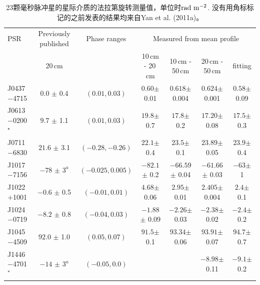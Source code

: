 \begin{landscape}
\begin{table}
\centering
\caption{23颗毫秒脉冲星的星际介质的法拉第旋转测量值，单位时$\rm{rad\ m^{-2}}$. 
没有用角标标记的之前发表的结果均来自Yan et al. (2011a)。}
\label{rm}
\begin{tabular}{lcccccc}
\hline
PSR          &    Previously published &  Phase ranges        &    \multicolumn{4}{c}{Measured from mean profile}                   \\  
             &    20\,cm               &                      &    10\,cm - 20\,cm  &  10\,cm - 50\,cm   &  20\,cm - 50\,cm   &    fitting      \\   
\hline
J0437$-$4715            & $0.0   $ $\pm$ 0.4      &  $(0.01, 0.03)   $ & $0.60   $$\pm$ 0.01  & $0.618   $$\pm$ 0.004 &  $0.624   $$\pm$ 0.001 &  $0.58   $$\pm$ 0.09   \\  
J0613$-$0200$^\star$    & $9.7   $ $\pm$ 1.1      &  $(0.01, 0.03)   $ & $19.8   $$\pm$ 0.7   & $17.8    $$\pm$ 0.2   &  $17.20   $$\pm$ 0.08  &  $17.5   $$\pm$ 0.3   \\  
J0711$-$6830            & $21.6  $ $\pm$ 3.1      &  $(-0.28, -0.26) $ & $22.1   $$\pm$ 0.4   & $23.5    $$\pm$ 0.1   &  $23.89   $$\pm$ 0.05  &  $23.9   $$\pm$ 0.4   \\  
J1017$-$7156            & $-78   $ $\pm$ $3^a$    &  $(-0.025, 0.005)$ & $-82.1  $$\pm$ 0.2   & $-66.59  $$\pm$ 0.04  &  $-61.66  $$\pm$ 0.03  &  $-63    $$\pm$ 1    \\
J1022$+$1001            & $-0.6  $ $\pm$ 0.5      &  $(-0.01, 0.01)  $ & $4.68   $$\pm$ 0.06  & $2.95    $$\pm$ 0.01  &  $2.405   $$\pm$ 0.004 &  $2.4    $$\pm$ 0.1   \\  
J1024$-$0719            & $-8.2  $ $\pm$ 0.8      &  $(-0.04, 0.03)  $ & $-1.88  $$\pm$ 0.09  & $-2.26   $$\pm$ 0.03  &  $-2.38   $$\pm$ 0.02  &  $-2.4   $$\pm$ 0.2    \\  
J1045$-$4509            & $92.0  $ $\pm$ 1.0      &  $(0.05, 0.07)   $ & $91.5   $$\pm$ 0.1   & $93.34   $$\pm$ 0.06  &  $93.91   $$\pm$ 0.07  &  $94.7   $$\pm$ 0.7    \\  
J1446$-$4701$^\ast$     & $-14   $ $\pm$ $3^a$    &  $(-0.05, 0.0)   $ &                      &                       &  $-8.98   $$\pm$ 0.11  &  $-9.1   $$\pm$ 0.2    \\

\end{tabular}
\end{table}
\end{landscape}
